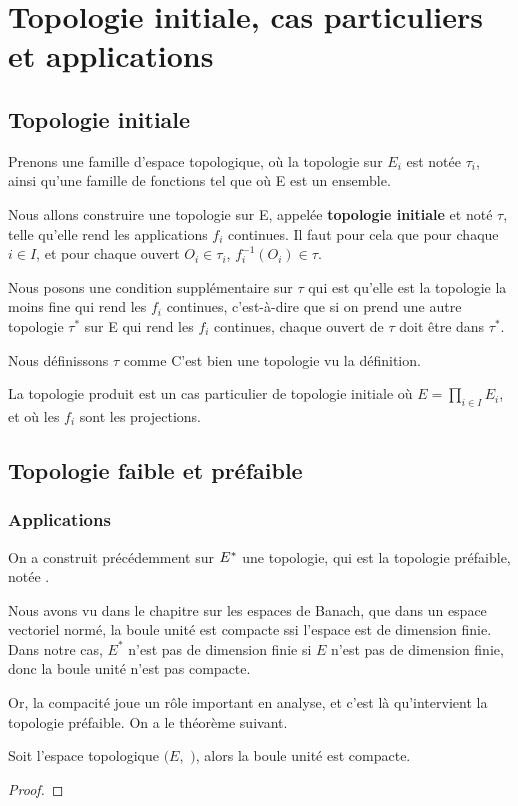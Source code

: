 \section{Topologie initiale, cas particuliers et applications}

\subsection{Topologie initiale}

Prenons une famille
 d'espace topologique, où la topologie sur $E_{i}$ est notée
$\tau_{i}$, ainsi qu'une famille de fonctions  tel que
 où E est un ensemble.

Nous allons construire une topologie sur E, appelée \textbf{topologie initiale}
et noté $\tau$, telle qu'elle rend les applications $f_{i}$ continues. Il faut pour cela que
pour chaque $i \in I$, et pour chaque ouvert $O_{i} \in \tau_{i}$,
$f_{i}^{-1}(O_{i}) \in \tau$.

Nous posons une condition supplémentaire sur $\tau$ qui est qu'elle est la
topologie la moins fine qui rend les $f_{i}$ continues, c'est-à-dire que si on
prend une autre topologie $\tau^{*}$ sur E qui rend les $f_{i}$ continues, chaque
ouvert de $\tau$ doit être dans $\tau^{*}$.

Nous définissons $\tau$ comme %
C'est bien une topologie vu la définition.

\begin{exemple}
	La topologie produit est un cas particulier de topologie initiale où $E =
	\displaystyle \prod_{i \in I} E_{i}$, et où les $f_{i}$ sont les projections.
\end{exemple}

\subsection{Topologie faible et préfaible}
\subsubsection{Applications}

On a construit précédemment sur $E^{*}$ une topologie, qui est la topologie
préfaible, notée .

Nous avons vu dans le chapitre sur les espaces de Banach, que dans un espace
vectoriel normé, la boule unité est compacte ssi l'espace est de dimension
finie. Dans notre cas, $E^{*}$ n'est pas de dimension finie si $E$ n'est pas de
dimension finie, donc la boule unité n'est pas compacte.

Or, la compacité joue un rôle important en analyse, et c'est là qu'intervient la topologie préfaible. On a le théorème suivant.

\begin{theorem}
	Soit l'espace topologique $(E,$ $)$, alors la boule unité
	est compacte.
\end{theorem}

\begin{proof}
	
\end{proof}
